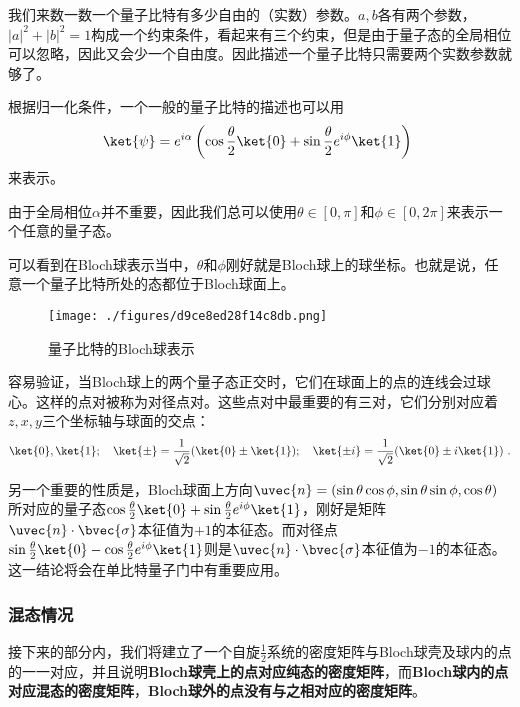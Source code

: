 我们来数一数一个量子比特有多少自由的（实数）参数。$a,b$各有两个参数，$|a|^2+|b|^2=1$构成一个约束条件，看起来有三个约束，但是由于量子态的全局相位可以忽略，因此又会少一个自由度。因此描述一个量子比特只需要两个实数参数就够了。

根据归一化条件，一个一般的量子比特的描述也可以用
\begin{equation}
\ket{\psi}=e^{i\alpha}\left(\cos\frac{\theta}{2}\ket{0}+\sin\frac{\theta}{2}e^{i\phi}\ket{1}\right)~
\end{equation}
来表示。

由于全局相位$\alpha$并不重要，因此我们总可以使用$\theta\in[0,\pi]$和$\phi\in[0,2\pi]$来表示一个任意的量子态。

可以看到在Bloch球表示当中，$\theta$和$\phi$刚好就是Bloch球上的球坐标。也就是说，任意一个量子比特所处的态都位于Bloch球面上。

\begin{figure}[ht]
\centering
\texttt{[image: ./figures/d9ce8ed28f14c8db.png]}
\caption{量子比特的Bloch球表示} \label{fig_Qubit}
\end{figure}

容易验证，当Bloch球上的两个量子态正交时，它们在球面上的点的连线会过球心。这样的点对被称为对径点对。这些点对中最重要的有三对，它们分别对应着$z,x,y$三个坐标轴与球面的交点：
\begin{equation}
\ket{0},\ket{1};\quad \ket{\pm}=\frac{1}{\sqrt{2}}(\ket{0}\pm\ket{1});\quad \ket{\pm i}=\frac{1}{\sqrt{2}}(\ket{0}\pm i\ket{1})~.
\end{equation}

另一个重要的性质是，Bloch球面上方向$\uvec{n}=(\sin\theta\cos\phi,\sin\theta\sin\phi,\cos\theta)$所对应的量子态$\cos\frac{\theta}{2}\ket{0}+\sin\frac{\theta}{2}e^{i\phi}\ket{1}$，刚好是矩阵$\uvec{n}\cdot\bvec{\sigma}$本征值为$+1$的本征态。而对径点$\sin\frac{\theta}{2}\ket{0}-\cos\frac{\theta}{2}e^{i\phi}\ket{1}$则是$\uvec{n}\cdot\bvec{\sigma}$本征值为$-1$的本征态。这一结论将会在单比特量子门中有重要应用。

\subsubsection{混态情况}

接下来的部分内，我们将建立了一个自旋$\frac{1}{2}$系统的密度矩阵与Bloch球壳及球内的点的一一对应，并且说明\textbf{Bloch球壳上的点对应纯态的密度矩阵}，而\textbf{Bloch球内的点对应混态的密度矩阵}，\textbf{Bloch球外的点没有与之相对应的密度矩阵}。



